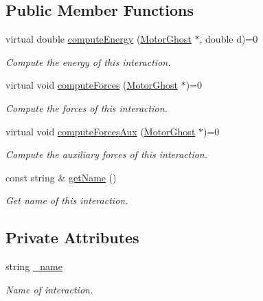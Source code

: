 \subsection*{Public Member Functions}
\begin{DoxyCompactItemize}
\item 
virtual double \hyperlink{classMotorGhostInteractions_a1c79cac7f3316463c596004b92e58767}{compute\+Energy} (\hyperlink{classMotorGhost}{Motor\+Ghost} $\ast$, double d)=0
\begin{DoxyCompactList}\small\item\em Compute the energy of this interaction. \end{DoxyCompactList}\item 
virtual void \hyperlink{classMotorGhostInteractions_a487ccdc249a0596d807fc0b954601cfd}{compute\+Forces} (\hyperlink{classMotorGhost}{Motor\+Ghost} $\ast$)=0
\begin{DoxyCompactList}\small\item\em Compute the forces of this interaction. \end{DoxyCompactList}\item 
virtual void \hyperlink{classMotorGhostInteractions_a51e76eb58135a740bff737139dcaa93f}{compute\+Forces\+Aux} (\hyperlink{classMotorGhost}{Motor\+Ghost} $\ast$)=0
\begin{DoxyCompactList}\small\item\em Compute the auxiliary forces of this interaction. \end{DoxyCompactList}\item 
const string \& \hyperlink{classMotorGhostInteractions_a7cb8fb7e66fbf572423c8af9919bba48}{get\+Name} ()
\begin{DoxyCompactList}\small\item\em Get name of this interaction. \end{DoxyCompactList}\end{DoxyCompactItemize}
\subsection*{Private Attributes}
\begin{DoxyCompactItemize}
\item 
string \hyperlink{classMotorGhostInteractions_ab5dfb52e5d74049a5f03e4671b649756}{\+\_\+name}
\begin{DoxyCompactList}\small\item\em Name of interaction. \end{DoxyCompactList}\end{DoxyCompactItemize}


